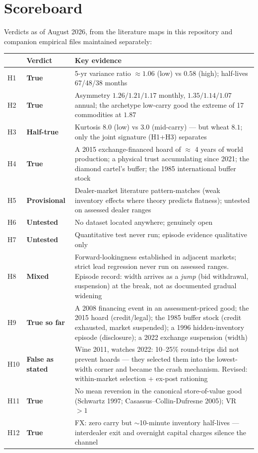 \documentclass[11pt]{article}
\begin{document}
\section{Scoreboard}\label{sec:scoreboard}

Verdicts as of August 2026, from the literature maps in this repository and companion empirical files maintained separately:

\begin{center}
\small
\begin{tabular}{@{}l l p{8.2cm}@{}}
\hline
 & \textbf{Verdict} & \textbf{Key evidence} \\
\hline
H1 & \textbf{True} & 5-yr variance ratio $\approx 1.06$ (low) vs $0.58$ (high); half-lives 67/48/38 months \\
H2 & \textbf{True} & Asymmetry $1.26/1.21/1.17$ monthly, $1.35/1.14/1.07$ annual; the archetype low-carry good the extreme of 17 commodities at $1.87$ \\
H3 & \textbf{Half-true} & Kurtosis $8.0$ (low) vs $3.0$ (mid-carry) --- but wheat $8.1$; only the joint signature (H1+H3) separates \\
H4 & \textbf{True} & A 2015 exchange-financed hoard of $\approx$ 4 years of world production; a physical trust accumulating since 2021; the diamond cartel's buffer; the 1985 international buffer stock \\
H5 & \textbf{Provisional} & Dealer-market literature pattern-matches (weak inventory effects where theory predicts flatness); untested on assessed dealer ranges \\
H6 & \textbf{Untested} & No dataset located anywhere; genuinely open \\
H7 & \textbf{Untested} & Quantitative test never run; episode evidence qualitative only \\
H8 & \textbf{Mixed} & Forward-lookingness established in adjacent markets; strict lead regression never run on assessed ranges. Episode record: width arrives as a \emph{jump} (bid withdrawal, suspension) at the break, not as documented gradual widening \\
H9 & \textbf{True so far} & A 2008 financing event in an assessment-priced good; the 2015 hoard (credit/legal); the 1985 buffer stock (credit exhausted, market suspended); a 1996 hidden-inventory episode (disclosure); a 2022 exchange suspension (width) \\
H10 & \textbf{False as stated} & Wine 2011, watches 2022: 10--25\% round-trips did not prevent hoards --- they selected them into the lowest-width corner and became the crash mechanism. Revised: within-market selection + ex-post rationing \\
H11 & \textbf{True} & No mean reversion in the canonical store-of-value good (Schwartz 1997; Casassus--Collin-Dufresne 2005); VR $> 1$ \\
H12 & \textbf{True} & FX: zero carry but $\sim$10-minute inventory half-lives --- interdealer exit and overnight capital charges silence the channel \\
\hline
\end{tabular}
\end{center}
\end{document}
